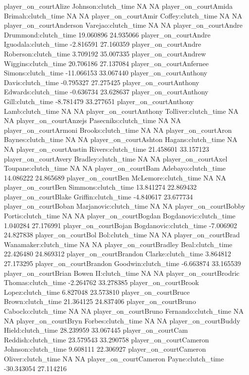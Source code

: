 \documentclass[
  landscape]{article}
\begin{document}
player\_on\_courtAlize Johnson:clutch\_time NA NA player\_on\_courtAmida
Brimah:clutch\_time NA NA player\_on\_courtAmir Coffey:clutch\_time NA
NA player\_on\_courtAnderson Varejao:clutch\_time NA NA
player\_on\_courtAndre Drummond:clutch\_time 19.060896 24.935066
player\_on\_courtAndre Iguodala:clutch\_time -2.816591 27.160359
player\_on\_courtAndre Roberson:clutch\_time 3.709192 35.007335
player\_on\_courtAndrew Wiggins:clutch\_time 20.706186 27.137084
player\_on\_courtAnfernee Simons:clutch\_time -11.066153 33.067440
player\_on\_courtAnthony Davis:clutch\_time -0.795327 27.275425
player\_on\_courtAnthony Edwards:clutch\_time -0.636734 23.628637
player\_on\_courtAnthony Gill:clutch\_time -8.781479 33.277651
player\_on\_courtAnthony Lamb:clutch\_time NA NA
player\_on\_courtAnthony Tolliver:clutch\_time NA NA
player\_on\_courtAnzejs Pasecniks:clutch\_time NA NA
player\_on\_courtArmoni Brooks:clutch\_time NA NA player\_on\_courtAron
Baynes:clutch\_time NA NA player\_on\_courtAshton Hagans:clutch\_time NA
NA player\_on\_courtAustin Rivers:clutch\_time 21.458601 33.157123
player\_on\_courtAvery Bradley:clutch\_time NA NA player\_on\_courtAxel
Toupane:clutch\_time NA NA player\_on\_courtBam Adebayo:clutch\_time
14.086222 24.865689 player\_on\_courtBen McLemore:clutch\_time NA NA
player\_on\_courtBen Simmons:clutch\_time 13.841274 22.869432
player\_on\_courtBlake Griffin:clutch\_time -4.840617 23.677734
player\_on\_courtBoban Marjanovic:clutch\_time NA NA
player\_on\_courtBobby Portis:clutch\_time NA NA player\_on\_courtBogdan
Bogdanovic:clutch\_time 1.040284 27.176991 player\_on\_courtBojan
Bogdanovic:clutch\_time -7.006902 24.827838 player\_on\_courtBol
Bol:clutch\_time NA NA player\_on\_courtBrad Wanamaker:clutch\_time NA
NA player\_on\_courtBradley Beal:clutch\_time 22.426480 24.869312
player\_on\_courtBrandon Clarke:clutch\_time 3.864812 27.173295
player\_on\_courtBrandon Goodwin:clutch\_time -6.663874 33.165539
player\_on\_courtBrian Bowen II:clutch\_time NA NA
player\_on\_courtBrodric Thomas:clutch\_time -2.264762 33.278385
player\_on\_courtBrook Lopez:clutch\_time 6.827048 23.573810
player\_on\_courtBruce Brown:clutch\_time 21.364125 24.837406
player\_on\_courtBruno Caboclo:clutch\_time NA NA player\_on\_courtBruno
Fernando:clutch\_time NA NA player\_on\_courtBryn Forbes:clutch\_time NA
NA player\_on\_courtBuddy Hield:clutch\_time 28.239959 33.067445
player\_on\_courtCam Reddish:clutch\_time 23.579543 33.290758
player\_on\_courtCameron Johnson:clutch\_time 9.608111 22.306927
player\_on\_courtCameron Oliver:clutch\_time NA NA
player\_on\_courtCameron Payne:clutch\_time -30.343054 27.114216
\end{document}
